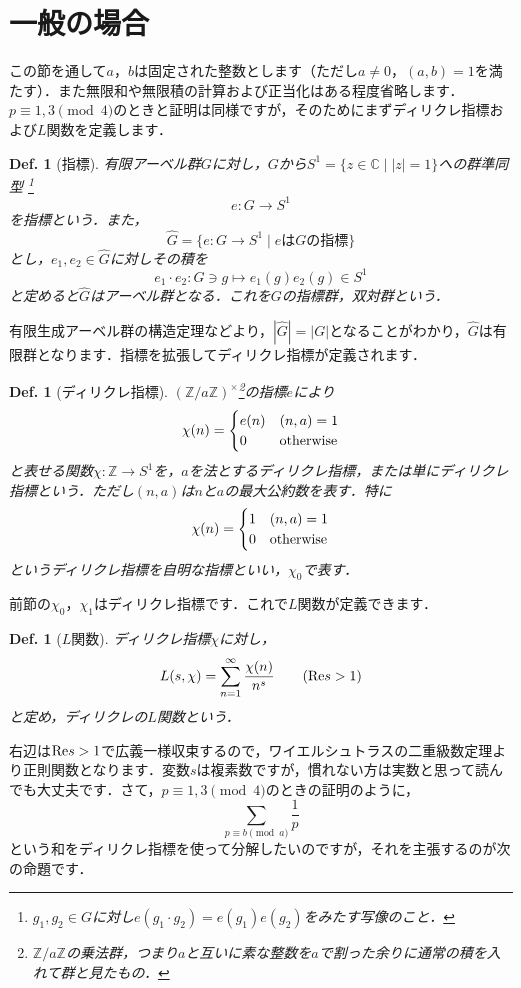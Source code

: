\documentclass[dvipdfmx,b5paper,papersize]{jsarticle}
\newtheorem{defi}[thm]{Def.}
\begin{document}
\section{一般の場合}
この節を通して$a$，$b$は固定された整数とします（ただし$a\neq 0$，$(a,b)=1$を満たす）．また無限和や無限積の計算および正当化はある程度省略します．$p\equiv 1,3\pmod{4}$のときと証明は同様ですが，そのためにまずディリクレ指標および$L$関数を定義します．
\begin{defi}[指標]
有限アーベル群$G$に対し，$G$から$S^1=\{z\in \mathbb{C} \mid |z|=1\}$への群準同型 \footnote{$g_1,g_2\in G$に対し$e(g_1\cdot g_2)=e(g_1)e(g_2)$をみたす写像のこと．}
\[
e:G \to S^1
\]
を指標という．また，
\[
\widehat{G}=\{e:G \to S^1 \mid eはGの指標\}
\]
とし，$e_1,e_2\in \widehat{G}$に対しその積を
\[
e_1\cdot e_2:G\ni g \mapsto e_1(g)e_2(g)\in S^1
\]
と定めると$\widehat{G}$はアーベル群となる．これを$G$の指標群，双対群という．
\end{defi}
有限生成アーベル群の構造定理などより，$|\widehat{G}|=|G|$となることがわかり，$\widehat{G}$は有限群となります．指標を拡張してディリクレ指標が定義されます．
\begin{defi}[ディリクレ指標]
$(\mathbb{Z}/a\mathbb{Z})^\times$\footnote{$\mathbb{Z}/a\mathbb{Z}$の乗法群，つまり$a$と互いに素な整数を$a$で割った余りに通常の積を入れて群と見たもの．}の指標$e$により
\[
\chi(n)=\begin{cases}
e(n) & (n,a)=1\\
0 &{\rm otherwise}
\end{cases}
\]
と表せる関数$\chi : \mathbb{Z} \to S^1$を，$a$を法とするディリクレ指標，または単にディリクレ指標という．ただし$(n,a)$は$n$と$a$の最大公約数を表す．特に
\[
\chi(n)=\begin{cases}
1 & (n,a)=1\\
0 & {\rm otherwise }
\end{cases}
\]
というディリクレ指標を自明な指標といい，$\chi_0$で表す．
\end{defi}
前節の$\chi_0$，$\chi_1$はディリクレ指標です．これで$L$関数が定義できます．
\begin{defi}[$L$関数]
ディリクレ指標$\chi$に対し，
\[
L(s,\chi)=\sum_{n=1}^\infty \frac{\chi(n)}{n^s} \qquad ({\rm Re} s>1)
\]
と定め，ディリクレの$L$関数という．
\end{defi}
右辺は${\rm Re} s>1$で広義一様収束するので，ワイエルシュトラスの二重級数定理より正則関数となります．変数$s$は複素数ですが，慣れない方は実数と思って読んでも大丈夫です．さて，$p\equiv 1,3\pmod{4}$のときの証明のように，
\[
\sum_{p\equiv b\pmod{a}}\frac{1}{p}
\]
という和をディリクレ指標を使って分解したいのですが，それを主張するのが次の命題です．
\end{document}
